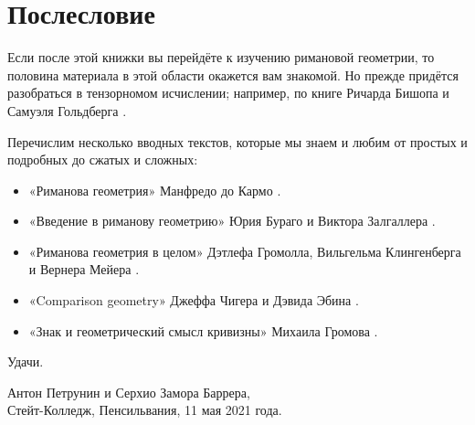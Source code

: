 \chapter{Послесловие}

Если после этой книжки вы перейдёте к изучению римановой геометрии, то половина материала в этой области окажется вам знакомой.
Но прежде придётся разобраться в тензорномом исчислении; например, по книге Ричарда Бишопа и Самуэля Гольдберга \cite{bishop-goldberg}.

Перечислим несколько вводных текстов, которые мы знаем и любим
от простых и подробных до сжатых и сложных:
\begin{itemize}
\item «Риманова геометрия»  Манфредо до Кармо \cite{carmo1992riemannian}.
\item «Введение в риманову геометрию» Юрия Бураго и Виктора Залгаллера \cite{burago-zalgaller}.
\item «Риманова геометрия в целом»  Дэтлефа Громолла, Вильгельма Клингенберга и Вернера Мейера \cite{gromoll-klingenberg-meyer,gromoll-klingenberg-meyer-ru}.
\item «Comparison geometry»  Джеффа Чигера и Дэвида Эбина \cite{cheeger-ebin}.
\item «Знак и геометрический смысл кривизны» Михаила Громова \cite{gromov-1991}.
\end{itemize}
Удачи.

\begin{flushright}
Антон Петрунин и Серхио Замора Баррера,\\
Стейт-Колледж, Пенсильвания, 11 мая 2021 года.
\end{flushright}

